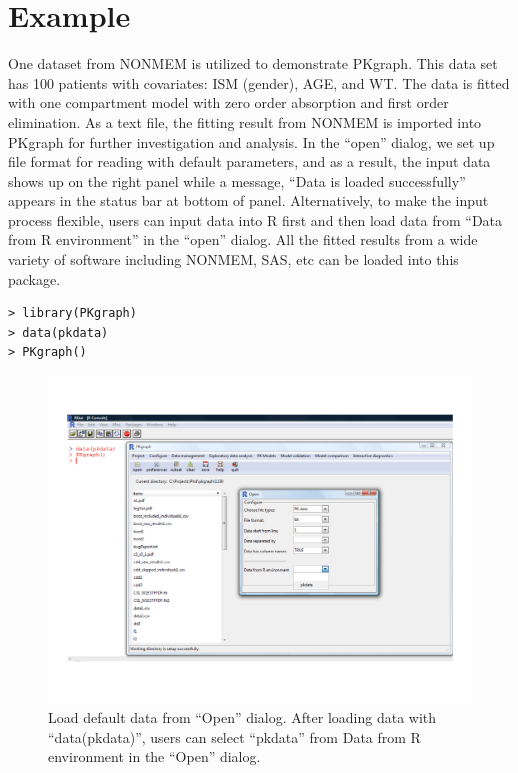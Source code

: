 \documentclass[a4paper]{article}
\begin{document}
\section{Example}
One dataset from NONMEM is utilized to demonstrate PKgraph. This data set has 100 patients with covariates: ISM (gender), AGE, and WT. The data is fitted with one compartment model with zero order absorption and first order elimination.
\newline
\newline
As a text file, the fitting result from NONMEM is imported into PKgraph for further investigation and analysis. In the ``open'' dialog, we set up file format for reading with default parameters, and as a result, the input data shows up on the right panel while a message, ``Data is loaded successfully'' appears in the status bar at bottom of panel.
\newline
\newline
Alternatively, to make the input process flexible, users can input data into R first and then load data from ``Data from R environment'' in the ``open'' dialog. All the fitted results from a wide variety of software including NONMEM, SAS, etc can be loaded into this package.
\begin{verbatim}
> library(PKgraph)
> data(pkdata)
> PKgraph()
\end{verbatim}
\begin{figure}[h!tb]
\centering
\includegraphics[scale=0.6]{inputData.pdf}
\caption{Load default data from ``Open'' dialog. After loading data with ``data(pkdata)'', users can select ``pkdata'' from Data from R environment in the ``Open'' dialog.}
\label{inputData}
\end{figure}
\end{document}
